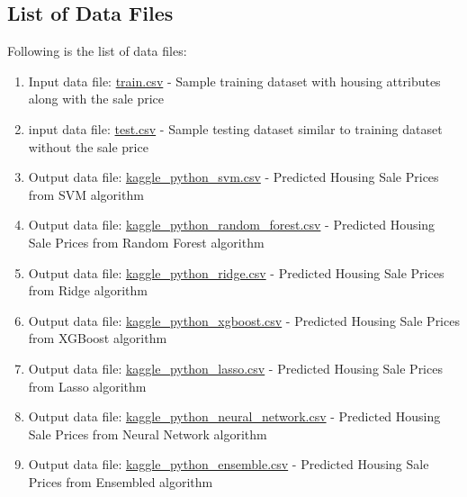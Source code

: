 \documentclass[sigconf]{acmart}
\begin{document}
     \subsection{List of Data Files}    
     Following is the list of data files:
    \begin{enumerate}        
    	\item Input data file: \href{https://github.com/bigdata-i523/hid306/blob/master/project/data/train.csv}{train.csv} - Sample training dataset with housing attributes along with the sale price
    	\item input data file: \href{https://github.com/bigdata-i523/hid306/blob/master/project/data/test.csv}{test.csv} - Sample testing dataset similar to training dataset without the sale price
    	
       	\item Output data file: \href{https://github.com/bigdata-i523/hid306/blob/master/project/data/kaggle_python_svm.csv}{kaggle\_python\_svm.csv} - Predicted Housing Sale Prices from SVM algorithm
       	
		\item Output data file: \href{https://github.com/bigdata-i523/hid306/blob/master/project/data/kaggle_python_random_forest.csv}{kaggle\_python\_random\_forest.csv} - Predicted Housing Sale Prices from Random Forest algorithm
		
		\item Output data file: \href{https://github.com/bigdata-i523/hid306/blob/master/project/data/kaggle_python_ridge.csv}{kaggle\_python\_ridge.csv} - Predicted Housing Sale Prices from Ridge algorithm
		
		\item Output data file: \href{https://github.com/bigdata-i523/hid306/blob/master/project/data/kaggle_python_xgboost.csv}{kaggle\_python\_xgboost.csv} - Predicted Housing Sale Prices from XGBoost algorithm
		
		\item Output data file: \href{https://github.com/bigdata-i523/hid306/blob/master/project/data/kaggle_python_lasso.csv}{kaggle\_python\_lasso.csv} - Predicted Housing Sale Prices from Lasso algorithm
		
		\item Output data file: \href{https://github.com/bigdata-i523/hid306/blob/master/project/data/kaggle_python_neural_network.csv}{kaggle\_python\_neural\_network.csv} - Predicted Housing Sale Prices from Neural Network algorithm
		
		\item Output data file: \href{https://github.com/bigdata-i523/hid306/blob/master/project/data/kaggle_python_ensemble.csv}{kaggle\_python\_ensemble.csv} - Predicted Housing Sale Prices from Ensembled algorithm    	
	\end{enumerate}    
   
\end{document}

